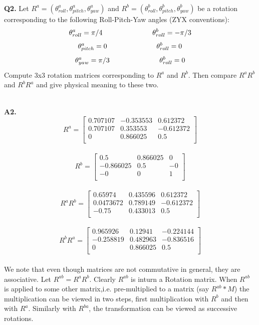\documentclass{article}
\newcommand\Problem[1]{
  \\
  \textbf{Q#1.}
}
\newcommand\Sol[1]{
  \\
  \textbf{A#1.}
  \\
}
\begin{document}
\Problem{2} Let $R^a = (\theta_{roll}^a, \theta_{pitch}^a, \theta_{yaw}^a)$ and $R^b = (\theta_{roll}^b, \theta_{pitch}^b, \theta_{yaw}^b)$ be a rotation corresponding to the following Roll-Pitch-Yaw angles (ZYX conventions):
$$\theta_{roll}^a = \pi/4 \hspace{2.5cm} \theta_{roll}^b = -\pi/3 $$
$$\theta_{pitch}^a = 0 \hspace{2.5cm} \theta_{roll}^b = 0 $$
$$\theta_{yaw}^a = \pi/3 \hspace{2.5cm} \theta_{roll}^b = 0 $$
Compute 3x3 rotation matrices corresponding to $R^a$ and $R^b$. Then compare $R^aR^b$ and $R^bR^a$ and give physical meaning to these two.
\Sol{2}
\[
  R^a =
  \begin{bmatrix}
    0.707107 & -0.353553 & 0.612372\\
 0.707107 & 0.353553 & -0.612372\\
        0 & 0.866025  &     0.5\\
  \end{bmatrix}
\]
\\
\[
  R^b =
  \begin{bmatrix}
          0.5  & 0.866025    &     0\\
-0.866025   &    0.5     &   -0\\
       -0    &     0     &    1\\
  \end{bmatrix}
\]
\\
\[
  R^aR^b =
  \begin{bmatrix}
    0.65974 & 0.435596 & 0.612372\\
    0.0473672 & 0.789149& -0.612372\\
    -0.75 & 0.433013   &    0.5\\
  \end{bmatrix}
\]
\\
\[
  R^bR^a =
  \begin{bmatrix}
    0.965926 &  0.12941 &-0.224144\\
    -0.258819&  0.482963& -0.836516\\
    0&  0.866025&       0.5\\
  \end{bmatrix}
\]
\\

We note that even though matrices are not commutative in general, they are associative. Let $R^{ab} = R^aR^b$. Clearly $R^{ab}$ is inturn a Rotation matrix. When $R^{ab}$ is applied to some other matrix,i.e. pre-multiplied to a matrix (say $R^{ab}*M$) the multiplication can be viewed in two steps, first multiplication with $R^b$ and then with $R^a$. Similarly with $R^{ba}$, the transformation can be viewed as successive rotations.
\end{document}
